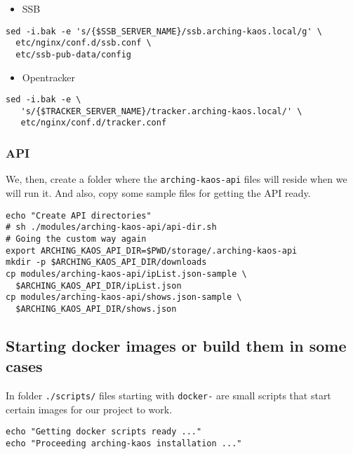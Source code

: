 \documentclass[12pt]{report}
\begin{document}
\begin{itemize}

\item
  SSB
\end{itemize}

\begin{verbatim}
sed -i.bak -e 's/{$SSB_SERVER_NAME}/ssb.arching-kaos.local/g' \
  etc/nginx/conf.d/ssb.conf \
  etc/ssb-pub-data/config
\end{verbatim}

\begin{itemize}

\item
  Opentracker
\end{itemize}

\begin{verbatim}
sed -i.bak -e \
   's/{$TRACKER_SERVER_NAME}/tracker.arching-kaos.local/' \
   etc/nginx/conf.d/tracker.conf
\end{verbatim}


\subsubsection{API}\label{api}

We, then, create a folder where the \texttt{arching-kaos-api} files will
reside when we will run it. And also, copy some sample files for getting
the API ready.

\begin{verbatim}
echo "Create API directories"
# sh ./modules/arching-kaos-api/api-dir.sh 
# Going the custom way again
export ARCHING_KAOS_API_DIR=$PWD/storage/.arching-kaos-api
mkdir -p $ARCHING_KAOS_API_DIR/downloads
cp modules/arching-kaos-api/ipList.json-sample \
  $ARCHING_KAOS_API_DIR/ipList.json
cp modules/arching-kaos-api/shows.json-sample \
  $ARCHING_KAOS_API_DIR/shows.json
\end{verbatim}


\subsection{Starting docker images or build them in some
cases}\label{starting-docker-images-or-build-them-in-some-cases}

In folder \texttt{./scripts/} files starting with \texttt{docker-} are
small scripts that start certain images for our project to work.

\begin{verbatim}
echo "Getting docker scripts ready ..."
echo "Proceeding arching-kaos installation ..."
\end{verbatim}
\end{document}
